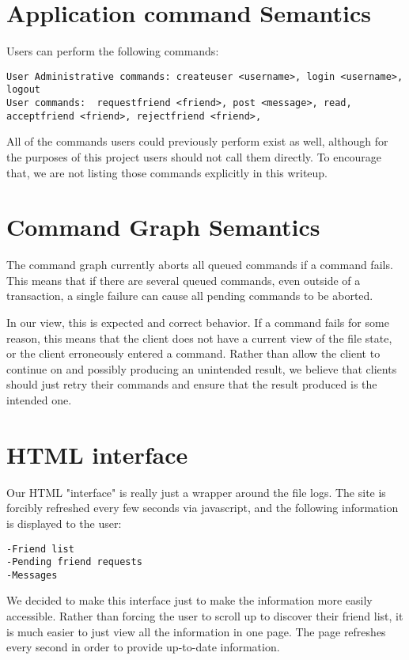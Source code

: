 \documentclass[11pt]{article}
\begin{document}
\section{Application command Semantics}

Users can perform the following commands:
\begin{verbatim}
User Administrative commands: createuser <username>, login <username>, logout
User commands:  requestfriend <friend>, post <message>, read, acceptfriend <friend>, rejectfriend <friend>,
\end{verbatim}

All of the commands users could previously perform exist as well, although for the purposes of this project users should not call them directly. To encourage that, we are not listing those commands explicitly in this writeup.

\section{Command Graph Semantics}

The command graph currently aborts all queued commands if a command fails.  This means that if there are several queued commands, even outside of a transaction, a single failure can cause all pending commands to be aborted. 

In our view, this is expected and correct behavior. If a command fails for some reason, this means that the client does not have a current view of the file state, or the client erroneously entered a command. Rather than allow the client to continue on and possibly producing an unintended result, we believe that clients should just retry their commands and ensure that the result produced is the intended one.

\section{HTML interface}

Our HTML "interface" is really just a wrapper around the file logs. The site is forcibly refreshed every few seconds via javascript, and the following information is displayed to the user:

\begin{verbatim}
-Friend list
-Pending friend requests
-Messages
\end{verbatim}

We decided to make this interface just to make the information more easily accessible. Rather than forcing the user to scroll up to discover their friend list, it is much easier to just view all the information in one page. The page refreshes every second in order to provide up-to-date information.
\end{document}
